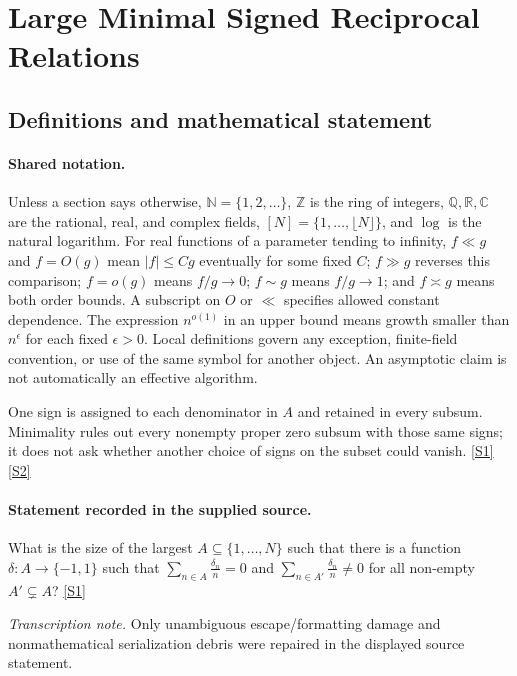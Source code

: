 \documentclass[11pt,a4paper]{article}
\newcommand{\N}{\mathbb{N}}
\newcommand{\Z}{\mathbb{Z}}
\newcommand{\Q}{\mathbb{Q}}
\newcommand{\R}{\mathbb{R}}
\newcommand{\C}{\mathbb{C}}
\newcommand{\sref}[2]{\hyperlink{source:#1:#2}{[S#2]}}
\begin{document}
\section{Large Minimal Signed Reciprocal Relations}\label{statement}


\subsection{Definitions and mathematical statement}

\paragraph{Shared notation.}Unless a section says otherwise, $\N=\{1,2,\ldots\}$,
$\Z$ is the ring of integers, $\Q,\R,\C$ are the rational, real, and complex
fields, $[N]=\{1,\ldots,\lfloor N\rfloor\}$, and $\log$ is the natural
logarithm. For real functions of a parameter tending to infinity,
$f\ll g$ and $f=O(g)$ mean $|f|\leq Cg$ eventually for some fixed $C$;
$f\gg g$ reverses this comparison; $f=o(g)$ means $f/g\to0$;
$f\sim g$ means $f/g\to1$; and $f\asymp g$ means both order bounds.
A subscript on $O$ or $\ll$ specifies allowed constant dependence.
The expression $n^{o(1)}$ in an upper bound means growth smaller than
$n^\epsilon$ for each fixed $\epsilon>0$. Local definitions govern any
exception, finite-field convention, or use of the same symbol for another
object. An asymptotic claim is not automatically an effective algorithm.



One sign is assigned to each denominator in $A$ and retained in every subsum. Minimality rules out every nonempty proper zero subsum with those same signs; it does not ask whether another choice of signs on the subset could vanish. \sref{statement}{1} \sref{statement}{2}

\paragraph{Statement recorded in the supplied source.}
What is the size of the largest $A\subseteq \{1,\ldots,N\}$ such that there is a function $\delta:A\to \{-1,1\}$ such that $ \sum_{n\in A}\frac{\delta_n}{n}=0 $ and $ \sum_{n\in A'}\frac{\delta_n}{n}\neq 0 $ for all non-empty $A'\subsetneq A$? \sref{statement}{1}

{\small\emph{Transcription note.} Only unambiguous escape/formatting damage and nonmathematical serialization debris were repaired in the displayed source statement.}
\end{document}
